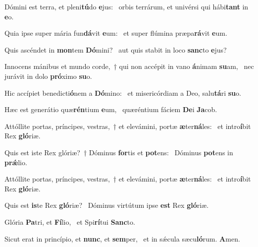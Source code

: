 \item Dómini est terra, et pleni\textbf{tú}do \textbf{e}jus:~\psstar{} orbis terrárum, et univérsi qui hábi\textbf{tant} in \textbf{e}o.
\item Quia ipse super mária fun\textbf{dá}vit \textbf{e}um:~\psstar{} et super flúmina præpa\textbf{rá}vit \textbf{e}um.
\item Quis ascéndet in \textbf{mon}tem \textbf{Dó}mini?~\psstar{} aut quis stabit in loco \textbf{sanc}to \textbf{e}jus?
\item Innocens mánibus et mundo corde,~† qui non accépit in vano \textbf{á}nimam \textbf{su}am,~\psstar{} nec jurávit in dolo \textbf{pró}ximo \textbf{su}o.
\item Hic accípiet benedicti\textbf{ó}nem a \textbf{Dó}mino:~\psstar{} et misericórdiam a Deo, salu\textbf{tá}ri \textbf{su}o.
\item Hæc est generátio quæ\textbf{rén}tium \textbf{e}um,~\psstar{} quæréntium fáciem \textbf{De}i \textbf{Ja}cob.
\item Attóllite portas, príncipes, vestras,~† et elevámini, portæ \textbf{æ}ter\textbf{ná}les:~\psstar{} et intro\textbf{í}bit Rex \textbf{gló}riæ.
\item Quis est iste Rex glóriæ?~† Dóminus \textbf{for}tis et \textbf{pot}ens:~\psstar{} Dóminus \textbf{pot}ens in \textbf{prǽ}lio.
\item Attóllite portas, príncipes, vestras,~† et elevámini, portæ \textbf{æ}ter\textbf{ná}les:~\psstar{} et intro\textbf{í}bit Rex \textbf{gló}riæ.
\item Quis est \textbf{is}te Rex \textbf{gló}riæ?~\psstar{} Dóminus virtútum ipse \textbf{est} Rex \textbf{gló}riæ.
\item Glória \textbf{Pa}tri, et \textbf{Fí}lio,~\psstar{} et Spi\textbf{rí}tui \textbf{Sanc}to.
\item Sicut erat in princípio, et \textbf{nunc}, et \textbf{sem}per,~\psstar{} et in sǽcula sæcu\textbf{ló}rum. \textbf{A}men.
